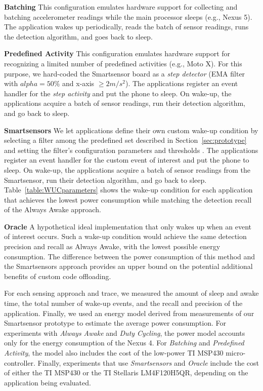 \textbf{Batching} This configuration emulates hardware support for
collecting and batching accelerometer readings while the main
processor sleeps (e.g., Nexus 5).  The application wakes up
periodically, reads the batch of sensor readings, runs the detection
algorithm, and goes back to sleep.

\textbf{Predefined Activity} This configuration emulates hardware
support for recognizing a limited number of predefined activities
(e.g., Moto X).  For this purpose, we hard-coded the Smartsensor board
as a {\em step detector} (EMA filter with $alpha = 50\%$ and x-axis
$\ge 2 m/s^2$).  The applications register an event handler for the {\em
  step activity} and put the phone to sleep.  On wake-up, the
applications acquire a batch of sensor readings, run their detection
algorithm, and go back to sleep.

\textbf{Smartsensors} We let applications define their own custom wake-up 
condition by selecting a filter among the predefined set described
in Section~\ref{sec:prototype} and setting the filter's configuration
parameters and thresholds .  The applications register an event handler
for the custom event of interest and put the phone to sleep.  On
wake-up, the applications acquire a batch of sensor readings from the
Smartsensor, run their detection algorithm, and go back to sleep.
Table~\ref{table:WUCparameters} shows the wake-up condition for each
application that achieves the lowest power consumption while matching
the detection recall of the Always Awake approach.

\textbf{Oracle} A hypothetical ideal implementation that only wakes up
when an event of interest occurs.  Such a wake-up condition would
achieve the same detection precision and recall as Always Awake, with
the lowest possible energy consumption. The difference between the
power consumption of this method and the Smartsensors approach
provides an upper bound on the potential additional benefits of custom
code offloading.

For each sensing approach and trace, we measured the amount of sleep
and awake time, the total number of wake-up events, and the recall and
precision of the application.  Finally, we used an energy model
derived from measurements of our Smartsensor prototype to estimate
the average power consumption.  For experiments with {\em Always Awake}
and {\em Duty Cycling}, the power model accounts only for the energy
consumption of the Nexus 4.  For {\em Batching} and {\em Predefined Activity},
the model also includes the cost of the low-power TI MSP430
micro-controller.  Finally, experiments that use {\em Smartsensors} and {\em
  Oracle} include the cost of either the TI MSP430 or the TI Stellaris
LM4F120H5QR, depending on the application being evaluated.








